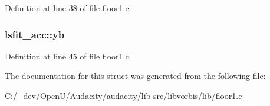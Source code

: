 Definition at line 38 of file floor1.\+c.

\subsubsection[{\texorpdfstring{yb}{yb}}]{ lsfit\+\_\+acc\+::yb}\hypertarget{structlsfit__acc_af9a2278c05a1861ab193dc90badefce4}{}\label{structlsfit__acc_af9a2278c05a1861ab193dc90badefce4}


Definition at line 45 of file floor1.\+c.



The documentation for this struct was generated from the following file\+:\begin{DoxyCompactItemize}
\item 
C\+:/\+\_\+dev/\+Open\+U/\+Audacity/audacity/lib-\/src/libvorbis/lib/\hyperlink{floor1_8c}{floor1.\+c}\end{DoxyCompactItemize}
